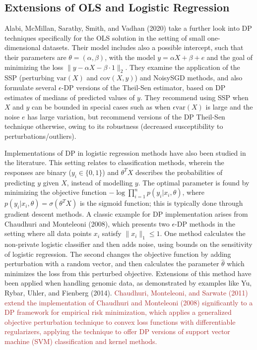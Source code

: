 \documentclass[11pt,conference]{IEEEtran}
\newcommand{\Var}{\textrm{var}}
\newcommand{\cov}{\textrm{cov}}
\begin{document}
\subsection{Extensions of OLS and Logistic Regression}
Alabi, McMillan, Sarathy, Smith, and Vadhan (2020) take a further look into DP techniques specifically for the OLS solution in the setting of small one-dimensional datasets. Their model includes also a possible intercept, such that their parameters are $\theta=(\alpha, \beta)$, with the model $y=\alpha X+\beta+e$ and the goal of minimizing the loss $\|y-\alpha X-\beta\cdot 1\|_2$. They examine the application of the SSP (perturbing $\Var(X)$ and $\cov(X,y)$) and NoisySGD methods, and also formulate several $\epsilon$-DP versions of the Theil-Sen estimator, based on DP estimates of medians of predicted values of $y$. They recommend using SSP when $X$ and $y$ can be bounded in special cases such as when $\epsilon\Var(X)$ is large and the noise $e$ has large variation, but recommend versions of the DP Theil-Sen technique otherwise, owing to its robustness (decreased susceptibility to perturbations/outliers). 

Implementations of DP in logistic regression methods have also been studied in the literature. This setting relates to classification methods, wherein the responses are binary ($y_i\in \{0,1\}$) and $\theta^T X$ describes the probabilities of predicting $y$ given $X$, instead of modelling $y$. The optimal parameter is found by minimizing the objective function $-\log\prod_{i=1}^n p(y_i|x_i,\theta)$, where $p(y_i|x_i,\theta)=\sigma(\theta^T X)$ is the sigmoid function; this is typically done through gradient descent methods. A classic example for DP implementation arises from Chaudhuri and Monteleoni (2008), which presents two $\epsilon$-DP methods in the setting where all data points $x_i$ satisfy $\|x_i\|_1\leq 1$. One method calculates the non-private logistic classifier and then adds noise, using bounds on the sensitivity of logistic regression. The second changes the objective function by adding perturbation with a random vector, and then calculates the parameter $\hat{\theta}$ which minimizes the loss from this perturbed objective. Extensions of this method have been applied when handling genomic data, as demonstrated by examples like Yu, Rybar, Uhler, and Fienberg (2014). \textcolor{brown}{Chaudhuri, Monteleoni, and Sarwate (2011) extend the implementation of Chaudhuri and Monteleoni (2008) significantly to a DP framework for empirical risk minimization, which applies a generalized objective perturbation technique to convex loss functions with differentiable regularizers, applying the technique to offer DP versions of support vector machine (SVM) classification and kernel methods.}
\end{document}

